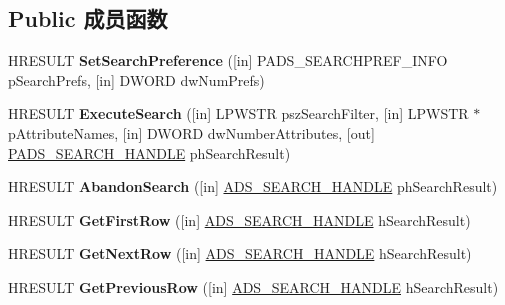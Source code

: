 \subsection*{Public 成员函数}
\begin{DoxyCompactItemize}
\item 
\mbox{\label{interface_i_directory_search_a8156e79e86eec7e09562ed3e2eb097cf}} 
H\+R\+E\+S\+U\+LT {\bfseries Set\+Search\+Preference} (\mbox{[}in\mbox{]} P\+A\+D\+S\+\_\+\+S\+E\+A\+R\+C\+H\+P\+R\+E\+F\+\_\+\+I\+N\+FO p\+Search\+Prefs, \mbox{[}in\mbox{]} D\+W\+O\+RD dw\+Num\+Prefs)
\item 
\mbox{\label{interface_i_directory_search_a14e1360247f177ef302a86235b031a2d}} 
H\+R\+E\+S\+U\+LT {\bfseries Execute\+Search} (\mbox{[}in\mbox{]} L\+P\+W\+S\+TR psz\+Search\+Filter, \mbox{[}in\mbox{]} L\+P\+W\+S\+TR $\ast$p\+Attribute\+Names, \mbox{[}in\mbox{]} D\+W\+O\+RD dw\+Number\+Attributes, \mbox{[}out\mbox{]} \hyperlink{interfacevoid}{P\+A\+D\+S\+\_\+\+S\+E\+A\+R\+C\+H\+\_\+\+H\+A\+N\+D\+LE} ph\+Search\+Result)
\item 
\mbox{\label{interface_i_directory_search_a98f24ffadd0957d1743359600b06457a}} 
H\+R\+E\+S\+U\+LT {\bfseries Abandon\+Search} (\mbox{[}in\mbox{]} \hyperlink{interfacevoid}{A\+D\+S\+\_\+\+S\+E\+A\+R\+C\+H\+\_\+\+H\+A\+N\+D\+LE} ph\+Search\+Result)
\item 
\mbox{\label{interface_i_directory_search_a6f794b94bca3a959b8b43c5777c00d29}} 
H\+R\+E\+S\+U\+LT {\bfseries Get\+First\+Row} (\mbox{[}in\mbox{]} \hyperlink{interfacevoid}{A\+D\+S\+\_\+\+S\+E\+A\+R\+C\+H\+\_\+\+H\+A\+N\+D\+LE} h\+Search\+Result)
\item 
\mbox{\label{interface_i_directory_search_a66550656dd4ee0cc1e7e652564765b59}} 
H\+R\+E\+S\+U\+LT {\bfseries Get\+Next\+Row} (\mbox{[}in\mbox{]} \hyperlink{interfacevoid}{A\+D\+S\+\_\+\+S\+E\+A\+R\+C\+H\+\_\+\+H\+A\+N\+D\+LE} h\+Search\+Result)
\item 
\mbox{\label{interface_i_directory_search_a02b41ddc448334932f0bce4cfa46b875}} 
H\+R\+E\+S\+U\+LT {\bfseries Get\+Previous\+Row} (\mbox{[}in\mbox{]} \hyperlink{interfacevoid}{A\+D\+S\+\_\+\+S\+E\+A\+R\+C\+H\+\_\+\+H\+A\+N\+D\+LE} h\+Search\+Result)

\end{DoxyCompactItemize}
